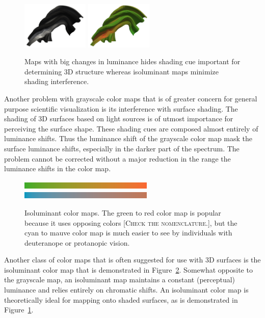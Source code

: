\documentclass[twocolumn]{article}
\newcommand{\sticky}[1]{\textsc{[#1]}}
\begin{document}
\begin{figure}
  \centering
  \includegraphics[width=1.25in]{images/GrayscaleShading}
  \includegraphics[width=1.25in]{images/IsoluminantShading}
  \caption{Maps with big changes in luminance hides shading cue important
    for determining 3D structure whereas isoluminant maps minimize shading
    interference.}
  \label{fig:LuminanceVsShading}
\end{figure}
Another problem with grayscale color maps that is of greater concern for
general purpose scientific visualization is its interference with surface
shading.  The shading of 3D surfaces based on light sources is of utmost
importance for perceiving the surface shape.  These shading cues are
composed almost entirely of luminance shifts.  Thus the luminance shift of
the grayscale color map mask the surface luminance shifts, especially in
the darker part of the spectrum.  The problem cannot be corrected without a
major reduction in the range the luminance shifts in the color map.

\begin{figure}
  \centering
  \includegraphics[width=2.5in]{images/Green2RedBar}\qquad
  \includegraphics[width=2.5in]{images/Cyan2MauveBar}
  \caption{Isoluminant color maps.  The green to red color map is popular
    because it uses opposing colors \sticky{Check the nomenclature.}, but
    the cyan to mauve color map is much easier to see by individuals with
    deuteranope or protanopic vision.}
  \label{fig:IsoluminantColorMap}
\end{figure}
Another class of color maps that is often suggested for use with 3D
surfaces is the isoluminant color map that is demonstrated in
Figure~\ref{fig:IsoluminantColorMap}.  Somewhat opposite to the grayscale
map, an isoluminant map maintains a constant (perceptual) luminance and
relies entirely on chromatic shifts.  An isoluminant color map is
theoretically ideal for mapping onto shaded surfaces, as is demonstrated in
Figure~\ref{fig:LuminanceVsShading}.
\end{document}
